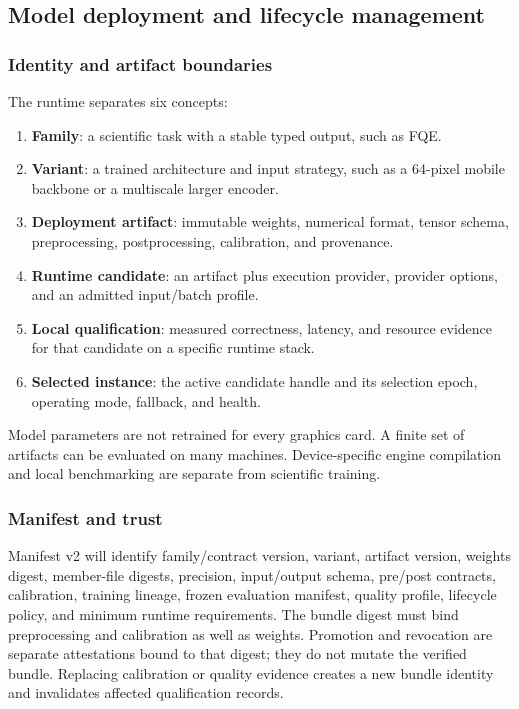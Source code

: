 \documentclass[11pt,a4paper]{article}
\begin{document}
\subsection{Model deployment and lifecycle management}
\label{sec:runtime}
\subsubsection{Identity and artifact boundaries}
The runtime separates six concepts:
\begin{enumerate}
\item \textbf{Family}: a scientific task with a stable typed output, such as FQE.
\item \textbf{Variant}: a trained architecture and input strategy, such as a
64-pixel mobile backbone or a multiscale larger encoder.
\item \textbf{Deployment artifact}: immutable weights, numerical format,
tensor schema, preprocessing, postprocessing, calibration, and provenance.
\item \textbf{Runtime candidate}: an artifact plus execution provider,
provider options, and an admitted input/batch profile.
\item \textbf{Local qualification}: measured correctness, latency, and resource
evidence for that candidate on a specific runtime stack.
\item \textbf{Selected instance}: the active candidate handle and its
selection epoch, operating mode, fallback, and health.
\end{enumerate}
Model parameters are not retrained for every graphics card. A finite set of
artifacts can be evaluated on many machines. Device-specific engine compilation
and local benchmarking are separate from scientific training.

\subsubsection{Manifest and trust}
Manifest v2 will identify family/contract version, variant, artifact version,
weights digest, member-file digests, precision, input/output schema, pre/post
contracts, calibration, training lineage, frozen evaluation manifest, quality
profile, lifecycle policy, and minimum runtime requirements. The bundle digest
must bind preprocessing and calibration as well as weights. Promotion and
revocation are separate attestations bound to that digest; they do not mutate
the verified bundle. Replacing calibration or quality evidence creates a new
bundle identity and invalidates affected qualification records.
\end{document}
